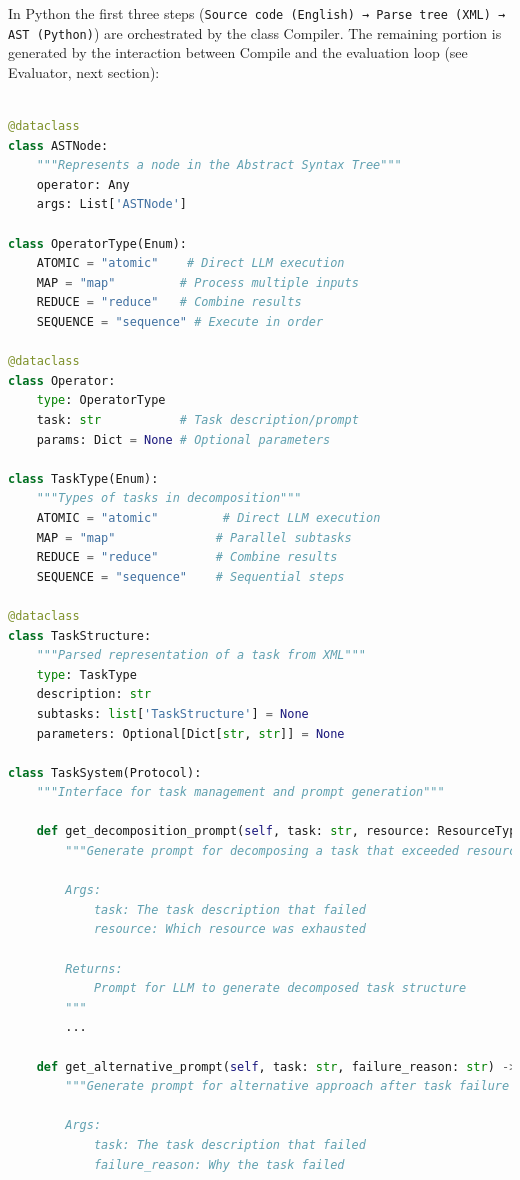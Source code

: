\documentclass{article}
\begin{document}
In Python the first three steps (\verb|Source code (English) → Parse tree (XML) → AST (Python)|) are orchestrated by the class Compiler. The remaining portion is generated by the interaction between Compile and the evaluation loop (see Evaluator, next section):

\begin{lstlisting}[language=Python]

@dataclass
class ASTNode:
    """Represents a node in the Abstract Syntax Tree"""
    operator: Any
    args: List['ASTNode']

class OperatorType(Enum):
    ATOMIC = "atomic"    # Direct LLM execution
    MAP = "map"         # Process multiple inputs
    REDUCE = "reduce"   # Combine results
    SEQUENCE = "sequence" # Execute in order

@dataclass
class Operator:
    type: OperatorType
    task: str           # Task description/prompt
    params: Dict = None # Optional parameters

class TaskType(Enum):
    """Types of tasks in decomposition"""
    ATOMIC = "atomic"         # Direct LLM execution
    MAP = "map"              # Parallel subtasks
    REDUCE = "reduce"        # Combine results
    SEQUENCE = "sequence"    # Sequential steps

@dataclass
class TaskStructure:
    """Parsed representation of a task from XML"""
    type: TaskType
    description: str
    subtasks: list['TaskStructure'] = None
    parameters: Optional[Dict[str, str]] = None

class TaskSystem(Protocol):
    """Interface for task management and prompt generation"""
    
    def get_decomposition_prompt(self, task: str, resource: ResourceType) -> str:
        """Generate prompt for decomposing a task that exceeded resources
        
        Args:
            task: The task description that failed
            resource: Which resource was exhausted
            
        Returns:
            Prompt for LLM to generate decomposed task structure
        """
        ...
        
    def get_alternative_prompt(self, task: str, failure_reason: str) -> str:
        """Generate prompt for alternative approach after task failure
        
        Args:
            task: The task description that failed
            failure_reason: Why the task failed
            

\end{lstlisting}
\end{document}

